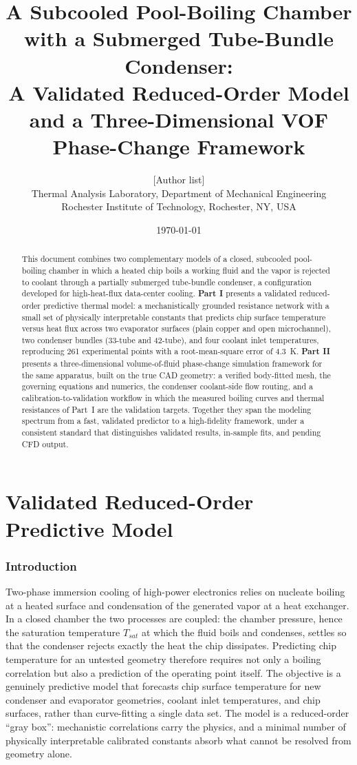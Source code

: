 \documentclass[11pt]{article}
\title{\textbf{A Subcooled Pool-Boiling Chamber with a Submerged Tube-Bundle Condenser:\\
A Validated Reduced-Order Model and a Three-Dimensional VOF Phase-Change Framework}}
\author{[Author list]\\
\small Thermal Analysis Laboratory, Department of Mechanical Engineering\\
\small Rochester Institute of Technology, Rochester, NY, USA}
\date{\today}
\begin{document}
\maketitle

\begin{abstract}
\noindent
This document combines two complementary models of a closed, subcooled pool-boiling
chamber in which a heated chip boils a working fluid and the vapor is rejected to coolant
through a partially submerged tube-bundle condenser, a configuration developed for
high-heat-flux data-center cooling. \textbf{Part I} presents a validated reduced-order
predictive thermal model: a mechanistically grounded resistance network with a small set of
physically interpretable constants that predicts chip surface temperature versus heat flux
across two evaporator surfaces (plain copper and open microchannel), two condenser bundles
(33-tube and 42-tube), and four coolant inlet temperatures, reproducing 261 experimental
points with a root-mean-square error of \SI{4.3}{K}. \textbf{Part II} presents a
three-dimensional volume-of-fluid phase-change simulation framework for the same apparatus,
built on the true CAD geometry: a verified body-fitted mesh, the governing equations and
numerics, the condenser coolant-side flow routing, and a calibration-to-validation workflow
in which the measured boiling curves and thermal resistances of Part~I are the validation
targets. Together they span the modeling spectrum from a fast, validated predictor to a
high-fidelity framework, under a consistent standard that distinguishes validated results,
in-sample fits, and pending CFD output.
\end{abstract}

\tableofcontents
\clearpage

\part{Validated Reduced-Order Predictive Model}

\section{Introduction}
Two-phase immersion cooling of high-power electronics relies on nucleate boiling at a
heated surface and condensation of the generated vapor at a heat exchanger. In a closed
chamber the two processes are coupled: the chamber pressure, hence the saturation
temperature $T_{sat}$ at which the fluid boils and condenses, settles so that the
condenser rejects exactly the heat the chip dissipates. Predicting chip temperature for
an untested geometry therefore requires not only a boiling correlation but also a
prediction of the operating point itself. The objective is a genuinely predictive model
that forecasts chip surface temperature for new condenser and evaporator geometries,
coolant inlet temperatures, and chip surfaces, rather than curve-fitting a single data
set. The model is a reduced-order ``gray box'': mechanistic correlations carry the
physics, and a minimal number of physically interpretable calibrated constants absorb
what cannot be resolved from geometry alone.
\end{document}
